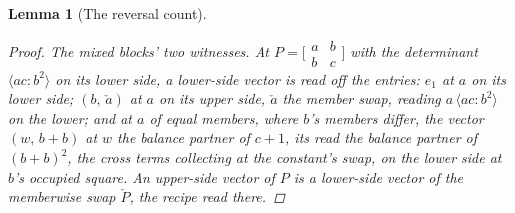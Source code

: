\documentclass[11pt]{article}
\newtheorem{lemma}{Lemma}
\theoremstyle{definition}
\begin{document}
\begin{lemma}[The reversal count]
\begin{proof}
\emph{The mixed blocks' two witnesses.} At
$P=\big[\begin{smallmatrix}a&b\\b&c\end{smallmatrix}\big]$ with the
determinant $\langle ac\!:\!b^2\rangle$ on its lower side, a
lower-side vector is read off the entries:
$e_1$ at $a$ on its lower side; $(b,\,\check a)$ at $a$ on its upper
side, $\check a$ the member swap,
reading $a\,\langle ac\!:\!b^2\rangle$ on the lower; and at $a$ of
equal members, where $b$'s members differ, the vector
$(w,\,b+b)$ at $w$ the balance partner of $c+1$, its read the
balance partner of $(b+b)^2$, the cross terms collecting at the
constant's swap, on the lower side at $b$'s occupied square. An upper-side
vector of $P$ is a lower-side vector of the memberwise swap
$\check P$, the recipe read there.


\end{proof}
\end{lemma}
\end{document}
